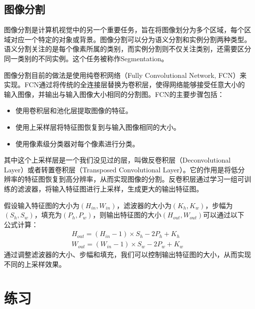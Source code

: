 \subsection{图像分割}

图像分割是计算机视觉中的另一个重要任务，旨在将图像划分为多个区域，每个区域对应一个特定的对象或背景。图像分割可以分为语义分割和实例分割两种类型。语义分割关注的是每个像素所属的类别，而实例分割则不仅关注类别，还需要区分同一类别的不同实例。这个任务被称作Segmentation。

图像分割目前的做法是使用纯卷积网络（Fully Convolutional Network, FCN）来实现。FCN通过将传统的全连接层替换为卷积层，使得网络能够接受任意大小的输入图像，并输出与输入图像大小相同的分割图。FCN的主要步骤包括：
\begin{itemize}
    \item 使用卷积层和池化层提取图像的特征。
    \item 使用上采样层将特征图恢复到与输入图像相同的大小。
    \item 使用像素级分类器对每个像素进行分类。
\end{itemize}

其中这个上采样层是一个我们没见过的层，叫做反卷积层（Deconvolutional Layer）或者转置卷积层（Transposed Convolutional Layer）。它的作用是将低分辨率的特征图恢复到高分辨率，从而实现图像的分割。反卷积层通过学习一组可训练的滤波器，将输入特征图进行上采样，生成更大的输出特征图。

假设输入特征图的大小为$(H_{in}, W_{in})$，滤波器的大小为$(K_h, K_w)$，步幅为$(S_h, S_w)$，填充为$(P_h, P_w)$，则输出特征图的大小$(H_{out}, W_{out})$可以通过以下公式计算：
\begin{align*}
H_{out} = (H_{in} - 1) \times S_h - 2P_h + K_h \\
W_{out} = (W_{in} - 1) \times S_w - 2P_w + K_w
\end{align*}
通过调整滤波器的大小、步幅和填充，我们可以控制输出特征图的大小，从而实现不同的上采样效果。

\section{练习}

